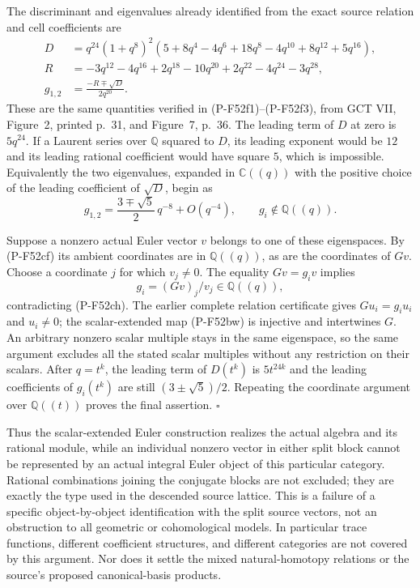The discriminant and eigenvalues already identified from the exact
source relation and cell coefficients are
\[
\begin{split}
 D&=q^{24}(1+q^8)^2
       (5+8q^4-4q^6+18q^8-4q^{10}+8q^{12}+5q^{16}),\\
 R&=-3q^{12}-4q^{16}+2q^{18}-10q^{20}
                     +2q^{22}-4q^{24}-3q^{28},\\
 g_{1,2}&=\frac{-R\mp\sqrt D}{2q^{20}}.
\end{split}
                                                               \tag{P-F52cg}
\]
These are the same quantities verified in (P-F52f1)--(P-F52f3),
from GCT VII, Figure~2, printed p.~31, and Figure~7, p.~36.
The leading term of $D$ at zero is $5q^{24}$.
If a Laurent series over $\mathbb Q$ squared to $D$, its leading
exponent would be $12$ and its leading rational coefficient would
have square $5$, which is impossible.  Equivalently the two
eigenvalues, expanded in $\mathbb C((q))$ with the positive choice
of the leading coefficient of $\sqrt D$, begin as
\[
          g_{1,2}=\frac{3\mp\sqrt5}{2}\,q^{-8}
                               +O(q^{-4}),
             \qquad g_i\notin\mathbb Q((q)).
                                                               \tag{P-F52ch}
\]

Suppose a nonzero actual Euler vector $v$ belongs to one of these
eigenspaces.  By (P-F52cf) its ambient coordinates are in
$\mathbb Q((q))$, as are the coordinates of $Gv$.
Choose a coordinate $j$ for which $v_j\ne0$.  The equality
$Gv=g_i v$ implies
\[
                         g_i=(Gv)_j/v_j\in\mathbb Q((q)),
                                                               \tag{P-F52ci}
\]
contradicting (P-F52ch).  The earlier complete relation certificate
gives $Gu_i=g_i u_i$ and $u_i\ne0$; the scalar-extended map
(P-F52bw) is injective and intertwines $G$.  An arbitrary nonzero scalar multiple stays
in the same eigenspace, so the same argument excludes all the
stated scalar multiples without any restriction on their scalars.
After $q=t^k$, the leading term of $D(t^k)$ is $5t^{24k}$ and the
leading coefficients of $g_i(t^k)$ are still
$(3\pm\sqrt5)/2$.  Repeating the coordinate argument over
$\mathbb Q((t))$ proves the final assertion.
\hfill$\square$

Thus the scalar-extended Euler construction realizes the actual
algebra and its rational module, while an individual nonzero vector
in either split block cannot be represented by an actual integral
Euler object of this particular category.  Rational combinations
joining the conjugate blocks are not excluded; they are exactly
the type used in the descended source lattice.  This is a failure
of a specific object-by-object identification with the split source
vectors, not an obstruction to all geometric or cohomological
models.  In particular trace functions, different coefficient
structures, and different categories are not covered by this
argument.  Nor does it settle the mixed natural-homotopy relations
or the source's proposed canonical-basis products.
